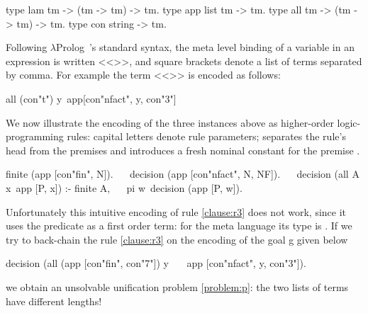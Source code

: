 \documentclass[sigconf,natbib=false,review]{acmart}
\begin{document}
\begin{elpicode}
type lam  tm -> (tm -> tm) -> tm.     %
type app  list tm -> tm.              %
type all  tm -> (tm -> tm) -> tm.     %
type con  string -> tm.               %
\end{elpicode}

\noindent
Following $\lambda$Prolog~\cite{miller_nadathur_2012}'s standard syntax,
the meta level binding of a variable  in an expression
 is written <<>>, and square brackets denote a
list of terms separated by comma. For example the term
<<>> is encoded as follows:

\begin{elpicode}
all (con"t") y\ app[con"nfact", y, con"3"]
\end{elpicode}

\noindent
We now illustrate the encoding of the three instances above as higher-order
logic-programming rules: capital letters denote rule
parameters; \elpiIn{:-} separates the rule's head from the premises and
 introduces a fresh nominal constant 
for the premise .

\begin{elpicode}
finite   (app [con"fin", N]).                         ~~
decision (app [con"nfact", N, NF]).                   ~~
decision (all A x\ app [P, x]) :- finite A,           ~~
  pi w\ decision (app [P, w]).
\end{elpicode}

\noindent
Unfortunately this intuitive encoding of rule \ref{clause:r3} does not work,
since it uses the predicate  as a first order term: for the meta
language its type is . If we try to back-chain the rule
\ref{clause:r3} on the encoding of the goal g given below

\begin{elpicode}
decision (all (app [con"fin", con"7"]) y\              ~~
  app [con"nfact", y, con"3"]).
\end{elpicode}

\noindent
we obtain an unsolvable unification problem \ref{problem:p}:
the two lists of terms have different lengths!
\end{document}
